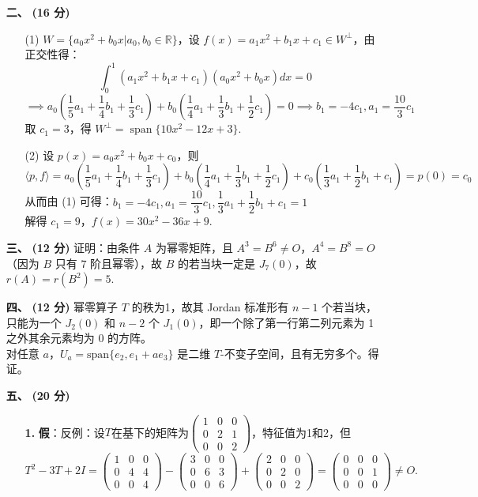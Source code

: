 \documentclass{ctexart}
\begin{document}
\begin{enumerate}
    \item[\textbf{二、}] \textbf{(16 分)} 
    \begin{enumerate}
        \item[(1)] \(W=\{a_0x^2+b_0x|a_0,b_0\in\mathbb{R}\}\)，设 \(f(x)=a_1 x^2+b_1 x+c_1\in W^\perp\)，由正交性得：
        \[
        \int_0^1 (a_1 x^2+b_1 x+c_1)(a_0x^2+b_0x)dx=0
        \]
        \[
        \implies a_0(\frac{1}{5}a_1+\frac{1}{4}b_1+\frac{1}{3}c_1)+b_0(\frac{1}{4}a_1+\frac{1}{3}b_1+\frac{1}{2}c_1) = 0 \implies b_1=-4c_1, a_1=\frac{10}{3}c_1
        \]
        取 \(c_1=3\)，得 \(W^\perp=\operatorname{span}\{10x^2-12x+3\}\).
        \item[(2)] 设 $p(x)=a_0x^2+b_0x+c_0$，则 
        \[\langle p,f\rangle=a_0(\frac{1}{5}a_1+\frac{1}{4}b_1+\frac{1}{3}c_1)+b_0(\frac{1}{4}a_1+\frac{1}{3}b_1+\frac{1}{2}c_1)+c_0(\frac{1}{3}a_1+\frac{1}{2}b_1+c_1)=p(0)=c_0\]
        从而由 (1) 可得：$b_1=-4c_1, a_1=\dfrac{10}{3}c_1, \dfrac{1}{3}a_1+\dfrac{1}{2}b_1+c_1=1$ \\
        解得 $c_1=9$，$f(x)=30x^2-36x+9$.
    \end{enumerate}
    \item[\textbf{三、}] \textbf{(12 分)} 证明：由条件 \(A\) 为幂零矩阵，且 $A^3=B^6\neq O$，$A^4=B^8=O$（因为 $B$ 只有 $7$ 阶且幂零），故 $B$ 的若当块一定是 $J_7(0)$，故 $r(A)=r(B^2)=5$.
    \item[\textbf{四、}] \textbf{(12 分)} 幂零算子 \(T\) 的秩为1，故其 Jordan 标准形有 $n-1$ 个若当块，只能为一个 $J_2(0)$ 和 $n-2$ 个 $J_1(0)$，即一个除了第一行第二列元素为 1 之外其余元素均为 0 的方阵。\\
    对任意 \(a\)，\(U_a=\text{span}\{e_2,e_1+ae_3\}\) 是二维 \(T\)-不变子空间，且有无穷多个。得证。
    \item[\textbf{五、}] \textbf{(20 分)} \begin{enumerate}
        \item[\textbf{1.}] \textbf{假}：反例：设\(T\)在基下的矩阵为\(\begin{pmatrix}1&0&0\\0&2&1\\0&0&2\end{pmatrix}\)，特征值为1和2，但  
        \[
        T^2 - 3T + 2I = \begin{pmatrix}1&0&0\\0&4&4\\0&0&4\end{pmatrix} - \begin{pmatrix}3&0&0\\0&6&3\\0&0&6\end{pmatrix} + \begin{pmatrix}2&0&0\\0&2&0\\0&0&2\end{pmatrix} = \begin{pmatrix}0&0&0\\0&0&1\\0&0&0\end{pmatrix} \neq O.
\]
\end{enumerate}
\end{enumerate}
\end{document}
